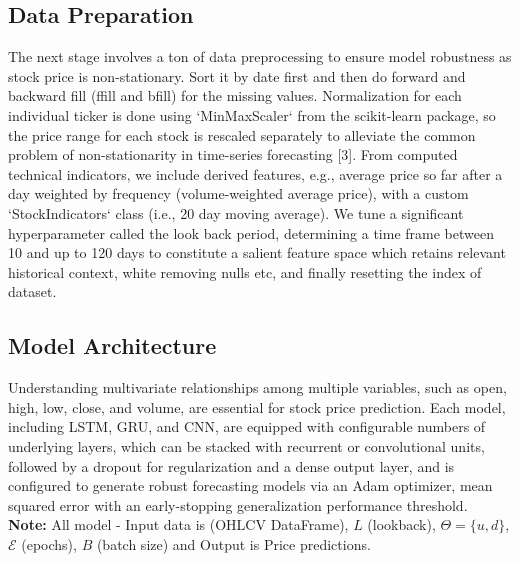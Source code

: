 \subsection{Data Preparation}
The next stage involves a ton of data preprocessing to ensure model robustness as stock price is non-stationary. Sort it by date first and then do forward and backward fill (ffill and bfill) for the missing values. Normalization for each individual ticker is done using `MinMaxScaler` from the scikit-learn package, so the price range for each stock is rescaled separately to alleviate the common problem of non-stationarity in time-series forecasting [3]. From computed technical indicators, we include derived features, e.g., average price so far after a day weighted by frequency (volume-weighted average price), with a custom `StockIndicators` class (i.e., 20 day moving average). We tune a significant hyperparameter called the look back period, determining a time frame between 10 and up to 120 days to constitute a salient feature space which retains relevant historical context, white removing nulls etc, and finally resetting the index of dataset.

\subsection{Model Architecture}
Understanding multivariate relationships among multiple variables, such as open, high, low, close, and volume, are essential for stock price prediction. Each model, including LSTM, GRU, and CNN, are equipped with configurable numbers of underlying layers, which can be stacked with recurrent or convolutional units, followed by a dropout for regularization and a dense output layer, and is configured to generate robust forecasting models via an Adam optimizer, mean squared error with an early-stopping generalization performance threshold.\\

\textbf{Note: } All model - Input data is (OHLCV DataFrame), $L$ (lookback), $\Theta = \{ u, d \}$, $\mathcal{E}$ (epochs), $B$ (batch size) and Output is Price predictions.


